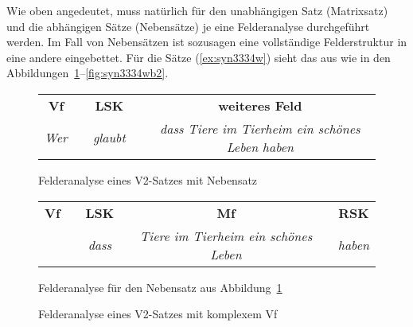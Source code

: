 \begin{exe}
  \ex\label{ex:saetze1426}
  \begin{xlist}
  \end{xlist}
\end{exe}

Wie oben angedeutet, muss natürlich für den unabhängigen Satz (Matrixsatz) und die abhängigen Sätze (Nebensätze) je eine Felderanalyse durchgeführt werden.
Im Fall von Nebensätzen ist sozusagen eine vollständige Felderstruktur in eine andere eingebettet.
Für die Sätze (\ref{ex:syn3334w}) sieht das aus wie in den Abbildungen~\ref{fig:syn3334wa1}--\ref{fig:syn3334wb2}.

\begin{figure}[!h]
  \centering
  \begin{tabular}{cp{0.1em}cp{0.1em}c}
    \textbf{Vf} && \textbf{LSK} && \textbf{weiteres Feld} \\
    \cmidrule{1-1}\cmidrule{3-3}\cmidrule{5-5}
    \textit{Wer} && \textit{glaubt} && \textit{dass Tiere im Tierheim ein schönes Leben haben} \\
  \end{tabular}
  \caption{Felderanalyse eines V2-Satzes mit Nebensatz}
  \label{fig:syn3334wa1}
\end{figure}

\begin{figure}[!h]
  \centering
  \begin{tabular}{cp{0.1em}cp{0.1em}cp{0.1em}c}
    \textbf{Vf} && \textbf{LSK} && \textbf{Mf} && \textbf{RSK} \\
    \cmidrule{1-1}\cmidrule{3-3}\cmidrule{5-5}\cmidrule{7-7}
    && \textit{dass} && \textit{Tiere im Tierheim ein schönes Leben} && \textit{haben} \\
  \end{tabular}
  \caption{Felderanalyse für den Nebensatz aus Abbildung~\ref{fig:syn3334wa1}}
  \label{fig:syn3334wa2}
\end{figure}

\begin{figure}[!h]
  \centering
  \caption{Felderanalyse eines V2-Satzes mit komplexem Vf}
  \label{fig:syn3334wb1}
\end{figure}

